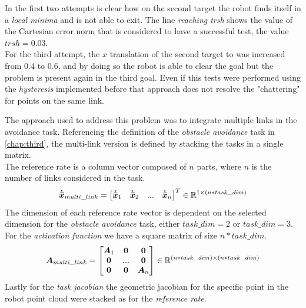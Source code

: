 \noindent In the first two attempts is clear how on the second target the robot finds itself in a \textit{local minima} and is not able to exit. The line \textit{reaching trsh} shows the value of the Cartesian error norm that is considered to have a successful test, the value $trsh = 0.03$.\\
\noindent For the third attempt, the $x$ translation of the second target to was increased from $0.4$  to $0.6$, and by doing so the robot is able to clear the goal but the problem is present again in the third goal. Even if this tests were performed using the \textit{hysteresis} implemented before that approach does not resolve the "chattering" for points on the same link. 

\noindent The approach used to address this problem was to integrate multiple links in the avoidance task. Referencing the definition of the \textit{obstacle avoidance} task in  \ref{chap:third}, the multi-link version is defined by stacking the tasks in a single matrix.\\
\noindent The reference rate is a column vector composed of $n$ parts, where $n$ is the number of links considered in the task.
\begin{equation}
	\vec{\dot{\bar{x}}}_{multi\_link} = 
	\begin{bmatrix}
		\vec{\dot{\bar{x}}}_{1} & \vec{\dot{\bar{x}}}_{2} & ... & \vec{\dot{\bar{x}}}_{n}
	\end{bmatrix}^T
	\hfill
	\in
	\hfill
	\mathbb{R}^{1\times (n*task\_dim)}
	\label{equat:multi_link_ref_rate}
\end{equation}
\noindent The dimension of each reference rate vector is dependent on the selected dimension for the \textit{obstacle avoidance} task, either $task\_dim = 2$ or $task\_dim = 3$. For the \textit{activation function} we have a square matrix of size $n*task\_dim$.
\begin{equation}
	\vec{A}_{multi\_link} = 
	\begin{bmatrix}
		\vec{A}_{1} & \vec{0} &  \vec{0} \\ 
		 		\vec{0}	& ... &  		\vec{0}	  \\
		 	\vec{0}		&  \vec{0}   & \vec{A}_{n}  \\
	\end{bmatrix}
	\hfill
	\in
	\hfill
	\mathbb{R}^{(n*task\_dim)\times (n*task\_dim)}
\end{equation}
\noindent Lastly for the \textit{task jacobian} the geometric jacobian for the specific point in the robot point cloud were stacked as for the \textit{reference rate}.
